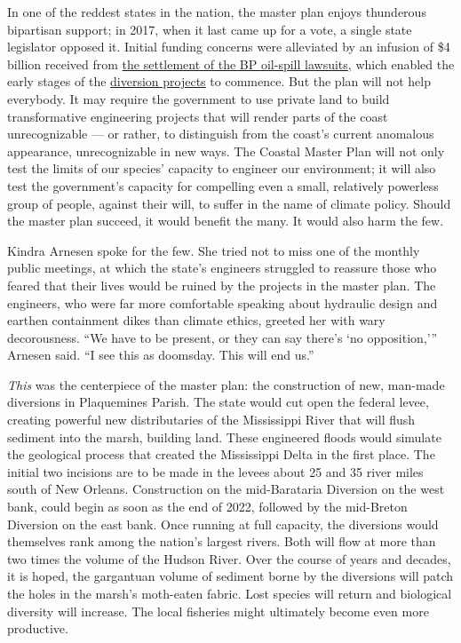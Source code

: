 In one of the reddest states in the nation, the master plan enjoys
thunderous bipartisan support; in 2017, when it last came up for a vote,
a single state legislator opposed it. Initial funding concerns were
alleviated by an infusion of \$4 billion received from
\href{https://www.nytimes.com/2012/03/03/us/accord-reached-settling-lawsuit-over-bp-oil-spill.html}{the
settlement of the BP oil-spill lawsuits}, which enabled the early stages
of the
\href{http://coastal.la.gov/our-work/key-initiatives/diversion-program/}{diversion
projects} to commence. But the plan will not help everybody. It may
require the government to use private land to build transformative
engineering projects that will render parts of the coast unrecognizable
--- or rather, to distinguish from the coast's current anomalous
appearance, unrecognizable in new ways. The Coastal Master Plan will not
only test the limits of our species' capacity to engineer our
environment; it will also test the government's capacity for compelling
even a small, relatively powerless group of people, against their will,
to suffer in the name of climate policy. Should the master plan succeed,
it would benefit the many. It would also harm the few.

Kindra Arnesen spoke for the few. She tried not to miss one of the
monthly public meetings, at which the state's engineers struggled to
reassure those who feared that their lives would be ruined by the
projects in the master plan. The engineers, who were far more
comfortable speaking about hydraulic design and earthen containment
dikes than climate ethics, greeted her with wary decorousness. ``We have
to be present, or they can say there's `no opposition,''' Arnesen said.
``I see this as doomsday. This will end us.''

\emph{This} was the centerpiece of the master plan: the construction of
new, man-made diversions in Plaquemines Parish. The state would cut open
the federal levee, creating powerful new distributaries of the
Mississippi River that will flush sediment into the marsh, building
land. These engineered floods would simulate the geological process that
created the Mississippi Delta in the first place. The initial two
incisions are to be made in the levees about 25 and 35 river miles south
of New Orleans. Construction on the mid-Barataria Diversion on the west
bank, could begin as soon as the end of 2022, followed by the mid-Breton
Diversion on the east bank. Once running at full capacity, the
diversions would themselves rank among the nation's largest rivers. Both
will flow at more than two times the volume of the Hudson River. Over
the course of years and decades, it is hoped, the gargantuan volume of
sediment borne by the diversions will patch the holes in the marsh's
moth-eaten fabric. Lost species will return and biological diversity
will increase. The local fisheries might ultimately become even more
productive.

